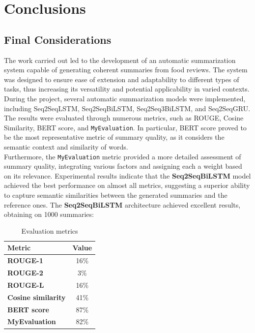 \section{Conclusions}
\subsection{Final Considerations}
The work carried out led to the development of an automatic summarization system capable of generating coherent summaries from food reviews. The system was designed to ensure ease of extension and adaptability to different types of tasks, thus increasing its versatility and potential applicability in varied contexts.\\
During the project, several automatic summarization models were implemented, including Seq2SeqLSTM, Seq2SeqBiLSTM, Seq2Seq3BiLSTM, and Seq2SeqGRU.
The results were evaluated through numerous metrics, such as ROUGE, Cosine Similarity, BERT score, and \texttt{MyEvaluation}. In particular,
BERT score proved to be the most representative metric of summary quality, as it considers the semantic context and similarity of words.\\

Furthermore, the \texttt{MyEvaluation} metric provided a more detailed assessment of summary quality, integrating various factors and assigning each a weight based on its relevance. Experimental results indicate that the \textbf{Seq2SeqBiLSTM} model achieved the best performance on almost all metrics,
suggesting a superior ability to capture semantic similarities between the generated summaries and the reference ones.
The \textbf{Seq2SeqBiLSTM} architecture achieved excellent results, obtaining on 1000 summaries:
\begin{table}[ht]
    \centering
    \begin{tabular}{@{} >{\bfseries}l c @{}}
        \toprule
        \textbf{Metric}    & \textbf{Value} \\
        \midrule
        ROUGE-1             & 16\%            \\
        ROUGE-2             & 3\%            \\
        ROUGE-L             & 16\%           \\
        Cosine similarity   & 41\%            \\
        BERT score           & 87\%            \\
        MyEvaluation        & 82\%            \\
        \bottomrule
    \end{tabular}
    \caption{Evaluation metrics}
\end{table}


